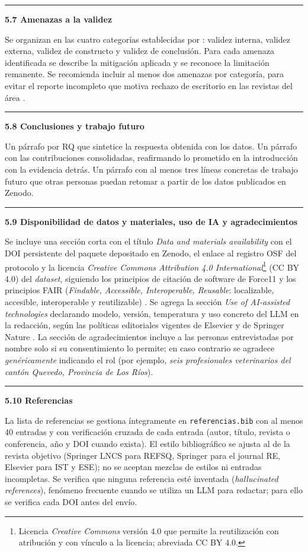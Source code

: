 \documentclass[11pt,a4paper]{article}
\newcounter{secc}
\newcommand{\submark}[1]{\par\vspace{4pt}\noindent
    {\color{uteqgreen}\rule[-1pt]{3.5pt}{12pt}}\hspace{6pt}\textbf{\color{uteqgreen}#1}\par\vspace{2pt}}
\begin{document}
\submark{5.7 Amenazas a la validez}
Se organizan en las cuatro categorías establecidas por \cite{wohlin2012experimentation}: validez interna, validez externa, validez de constructo y validez de conclusión.
Para cada amenaza identificada se describe la mitigación aplicada y se reconoce la limitación remanente.
Se recomienda incluir al menos dos amenazas por categoría, para evitar el reporte incompleto que motiva rechazo de escritorio en las revistas del área \cite{siegmund2015views}.

\submark{5.8 Conclusiones y trabajo futuro}
Un párrafo por RQ que sintetice la respuesta obtenida con los datos.
Un párrafo con las contribuciones consolidadas, reafirmando lo prometido en la introducción con la evidencia detrás.
Un párrafo con al menos tres líneas concretas de trabajo futuro que otras personas puedan retomar a partir de los datos publicados en Zenodo.

\submark{5.9 Disponibilidad de datos y materiales, uso de IA y agradecimientos}
Se incluye una sección corta con el título \emph{Data and materials availability} con el DOI persistente del paquete depositado en Zenodo, el enlace al registro OSF del protocolo y la licencia \emph{Creative Commons Attribution 4.0 International}\footnote{Licencia \emph{Creative Commons} versión 4.0 que permite la reutilización con atribución y con vínculo a la licencia; abreviada CC BY 4.0.} (CC BY 4.0) del \emph{dataset}, siguiendo los principios de citación de software de Force11 \cite{smith2016force11} y los principios FAIR (\emph{Findable, Accessible, Interoperable, Reusable}: localizable, accesible, interoperable y reutilizable) \cite{wilkinson2016fair}.
Se agrega la sección \emph{Use of AI-assisted technologies} declarando modelo, versión, temperatura y uso concreto del LLM en la redacción, según las políticas editoriales vigentes de Elsevier \cite{elsevier_ai_2023} y de Springer Nature \cite{springer_ai_2023}.
La sección de agradecimientos incluye a las personas entrevistadas por nombre solo si su consentimiento lo permite; en caso contrario se agradece \emph{genéricamente} indicando el rol (por ejemplo, \emph{seis profesionales veterinarios del cantón Quevedo, Provincia de Los Ríos}).

\submark{5.10 Referencias}
La lista de referencias se gestiona íntegramente en \texttt{referencias.bib} con al menos 40 entradas y con verificación cruzada de cada entrada (autor, título, revista o conferencia, año y DOI cuando exista).
El estilo bibliográfico se ajusta al de la revista objetivo (Springer LNCS para REFSQ, Springer para el journal RE, Elsevier para IST y ESE); no se aceptan mezclas de estilos ni entradas incompletas.
Se verifica que ninguna referencia esté inventada (\emph{hallucinated references}), fenómeno frecuente cuando se utiliza un LLM para redactar; para ello se verifica cada DOI antes del envío.
\end{document}
